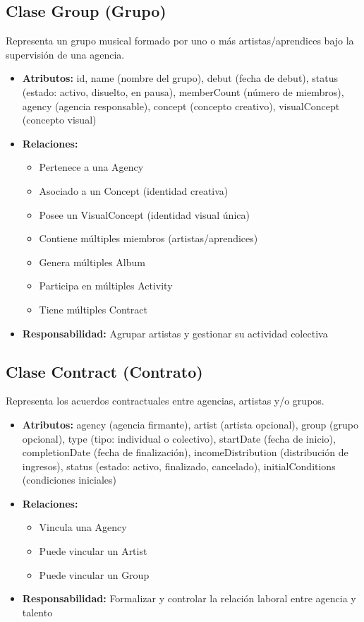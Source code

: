 \documentclass[12pt,a4paper,spanish,oneside]{report}
\begin{document}
\subsection{Clase Group (Grupo)}
Representa un grupo musical formado por uno o más artistas/aprendices bajo la supervisión de una agencia.

\begin{itemize}
	\item \textbf{Atributos:} id, name (nombre del grupo), debut (fecha de debut), status (estado: activo, disuelto, en pausa), memberCount (número de miembros), agency (agencia responsable), concept (concepto creativo), visualConcept (concepto visual)
	\item \textbf{Relaciones:}
	\begin{itemize}
		\item Pertenece a una Agency
		\item Asociado a un Concept (identidad creativa)
		\item Posee un VisualConcept (identidad visual única)
		\item Contiene múltiples miembros (artistas/aprendices)
		\item Genera múltiples Album
		\item Participa en múltiples Activity
		\item Tiene múltiples Contract
	\end{itemize}
	\item \textbf{Responsabilidad:} Agrupar artistas y gestionar su actividad colectiva
\end{itemize}

\subsection{Clase Contract (Contrato)}
Representa los acuerdos contractuales entre agencias, artistas y/o grupos.

\begin{itemize}
	\item \textbf{Atributos:} agency (agencia firmante), artist (artista opcional), group (grupo opcional), type (tipo: individual o colectivo), startDate (fecha de inicio), completionDate (fecha de finalización), incomeDistribution (distribución de ingresos), status (estado: activo, finalizado, cancelado), initialConditions (condiciones iniciales)
	\item \textbf{Relaciones:}
	\begin{itemize}
		\item Vincula una Agency
		\item Puede vincular un Artist
		\item Puede vincular un Group
	\end{itemize}
	\item \textbf{Responsabilidad:} Formalizar y controlar la relación laboral entre agencia y talento
\end{itemize}
\end{document}
